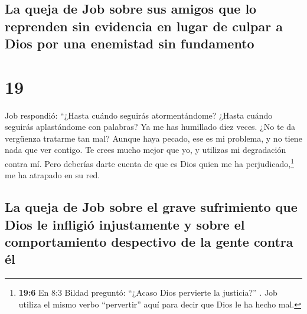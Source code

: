 \hypertarget{la-queja-de-job-sobre-sus-amigos-que-lo-reprenden-sin-evidencia-en-lugar-de-culpar-a-dios-por-una-enemistad-sin-fundamento}{%
\subsection{La queja de Job sobre sus amigos que lo reprenden sin
evidencia en lugar de culpar a Dios por una enemistad sin
fundamento}\label{la-queja-de-job-sobre-sus-amigos-que-lo-reprenden-sin-evidencia-en-lugar-de-culpar-a-dios-por-una-enemistad-sin-fundamento}}

\hypertarget{section-18}{%
\section{19}\label{section-18}}

 Job respondió:  ``¿Hasta cuándo seguirás
atormentándome? ¿Hasta cuándo seguirás aplastándome con palabras?
 Ya me has humillado diez veces. ¿No te da vergüenza
tratarme tan mal?  Aunque haya pecado, ese es mi problema,
y no tiene nada que ver contigo.  Te crees mucho mejor que
yo, y utilizas mi degradación contra mí.  Pero deberías
darte cuenta de que es Dios quien me ha perjudicado,\footnote{\textbf{19:6}
  En 8:3 Bildad preguntó: ``¿Acaso Dios pervierte la justicia?'' . Job
  utiliza el mismo verbo ``pervertir'' aquí para decir que Dios le ha
  hecho mal.} me ha atrapado en su red.

\hypertarget{la-queja-de-job-sobre-el-grave-sufrimiento-que-dios-le-infligiuxf3-injustamente-y-sobre-el-comportamiento-despectivo-de-la-gente-contra-uxe9l}{%
\subsection{La queja de Job sobre el grave sufrimiento que Dios le
infligió injustamente y sobre el comportamiento despectivo de la gente
contra
él}\label{la-queja-de-job-sobre-el-grave-sufrimiento-que-dios-le-infligiuxf3-injustamente-y-sobre-el-comportamiento-despectivo-de-la-gente-contra-uxe9l}}

